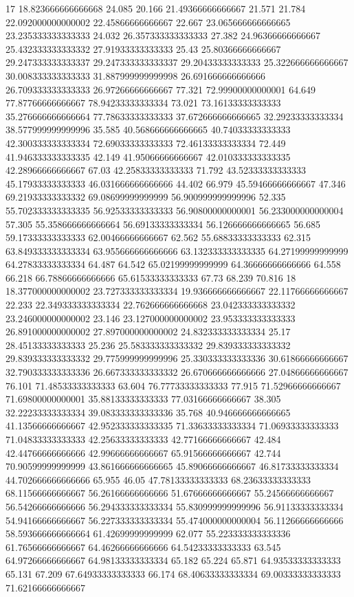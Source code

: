 17 18.823666666666668 24.085 20.166 21.49366666666667 21.571 21.784 22.092000000000002 22.45866666666667 22.667 23.065666666666665 23.235333333333333 24.032 26.357333333333333 27.382 24.96366666666667 25.432333333333332 27.91933333333333 25.43 25.80366666666667 29.247333333333337 29.247333333333337 29.20433333333333 25.322666666666667 30.008333333333333 31.887999999999998 26.691666666666666 26.709333333333333 26.97266666666667 77.321 72.99900000000001 64.649 77.87766666666667 78.94233333333334 73.021 73.16133333333333 35.276666666666664 77.78633333333333 37.672666666666665 32.29233333333334 38.577999999999996 35.585 40.568666666666665 40.74033333333333 42.300333333333334 72.69033333333333 72.46133333333334 72.449 41.946333333333335 42.149 41.95066666666667 42.010333333333335 42.28966666666667 67.03 42.25833333333333 71.792 43.52333333333333 45.17933333333333 46.031666666666666 44.402 66.979 45.59466666666667 47.346 69.21933333333332 69.08699999999999 56.900999999999996 52.335 55.702333333333335 56.92533333333333 56.90800000000001 56.233000000000004 57.305 55.358666666666664 56.69133333333334 56.126666666666665 56.685 59.17333333333333 62.00466666666667 62.562 55.68833333333333 62.315 63.849333333333334 63.955666666666666 63.132333333333335 64.27199999999999 64.27833333333334 64.487 64.542 65.02199999999999 64.36666666666666 64.558 66.218 66.78866666666666 65.61533333333333 67.73 68.239 70.816
18 18.377000000000002 23.727333333333334 19.936666666666667 22.11766666666667 22.233 22.349333333333334 22.762666666666668 23.042333333333332 23.246000000000002 23.146 23.127000000000002 23.953333333333333 26.891000000000002 27.897000000000002 24.832333333333334 25.17 28.45133333333333 25.236 25.583333333333332 29.839333333333332 29.839333333333332 29.775999999999996 25.330333333333336 30.61866666666667 32.790333333333336 26.667333333333332 26.670666666666666 27.04866666666667 76.101 71.48533333333333 63.604 76.77733333333333 77.915 71.52966666666667 71.69800000000001 35.88133333333333 77.03166666666667 38.305 32.22233333333334 39.083333333333336 35.768 40.946666666666665 41.13566666666667 42.952333333333335 71.33633333333334 71.06933333333333 71.04833333333333 42.25633333333333 42.77166666666667 42.484 42.44766666666666 42.99666666666667 65.91566666666667 42.744 70.90599999999999 43.861666666666665 45.89066666666667 46.81733333333334 44.702666666666666 65.955 46.05 47.78133333333333 68.23633333333333 68.11566666666667 56.26166666666666 51.67666666666667 55.24566666666667 56.54266666666666 56.294333333333334 55.830999999999996 56.91133333333334 54.94166666666667 56.227333333333334 55.474000000000004 56.11266666666666 58.593666666666664 61.42699999999999 62.077 55.223333333333336 61.76566666666667 64.46266666666666 64.54233333333333 63.545 64.97266666666667 64.98133333333334 65.182 65.224 65.871 64.93533333333333 65.131 67.209 67.64933333333333 66.174 68.40633333333334 69.00333333333333 71.62166666666667
